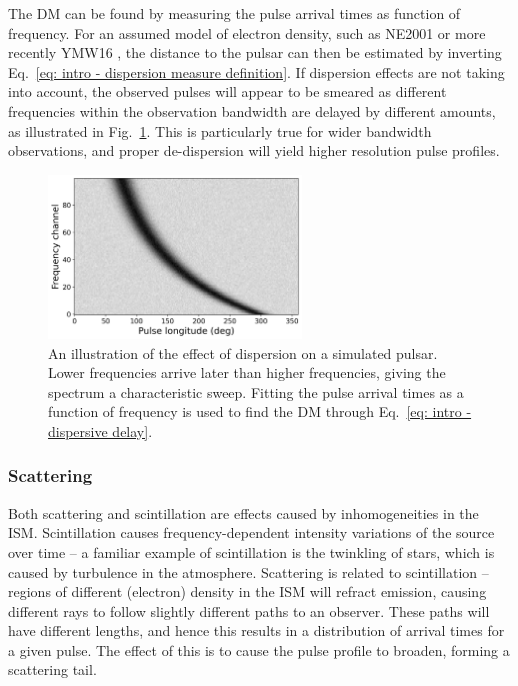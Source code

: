 The DM can be found by measuring the pulse arrival times as function of frequency. For an assumed model of electron density, such as NE2001 \citep{CLxx2002} or more recently YMW16 \citep{YMWx2016}, the distance to the pulsar can then be estimated by inverting Eq.~\eqref{eq: intro - dispersion measure definition}. If dispersion effects are not taking into account, the observed pulses will appear to be smeared as different frequencies within the observation bandwidth are delayed by different amounts, as illustrated in Fig.~\ref{fig: intro - DM illustration}. This is particularly true for wider bandwidth observations, and proper de-dispersion will yield higher resolution pulse profiles.
\begin{figure}
	\centering
	\includegraphics[width=0.6\textwidth]{Figures/Introduction/DM_effects}
    \caption[The effect of dispersion on a pulse profile]{An illustration of the effect of dispersion on a simulated pulsar. Lower frequencies arrive later than higher frequencies, giving the spectrum a characteristic sweep. Fitting the pulse arrival times as a function of frequency is used to find the DM through Eq.~\eqref{eq: intro - dispersive delay}.}
    \label{fig: intro - DM illustration} 
\end{figure}




\subsubsection{Scattering}
\label{sec: intro - observation processing - ISM effects - scattering}

Both scattering and scintillation are effects caused by inhomogeneities in the ISM. Scintillation causes frequency-dependent intensity variations of the source over time -- a familiar example of scintillation is the twinkling of stars, which is caused by turbulence in the atmosphere. Scattering is related to scintillation -- regions of different (electron) density in the ISM will refract emission, causing different rays to follow slightly different paths to an observer. These paths will have different lengths, and hence this results in a distribution of arrival times for a given pulse. The effect of this is to cause the pulse profile to broaden, forming a scattering tail.

